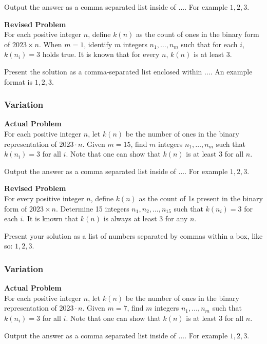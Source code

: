 Output the answer as a comma separated list inside of $\boxed{...}$. For example $\boxed{1, 2, 3}$.

\textbf{Revised Problem}\\
For each positive integer $n$, define $k(n)$ as the count of ones in the binary form of $2023 \times n$. 
When $m = 1$, identify $m$ integers $n_1, \dots, n_m$ such that for each $i$, $k(n_i) = 3$ holds true.
It is known that for every $n$, $k(n)$ is at least $3$.

Present the solution as a comma-separated list enclosed within $\boxed{...}$. An example format is $\boxed{1, 2, 3}$.

\subsubsection{Variation}
\textbf{Actual Problem}\\
For each positive integer $n$, let $k(n)$ be the number of ones in the binary representation of $2023 \cdot n$. 
Given $m = 15$, find $m$ integers $n_1, \dots, n_m$ such that $k(n_i) = 3$ for all $i$.
Note that one can show that $k(n)$ is at least $3$ for all $n$.

Output the answer as a comma separated list inside of $\boxed{...}$. For example $\boxed{1, 2, 3}$.

\textbf{Revised Problem}\\
For every positive integer \( n \), define \( k(n) \) as the count of 1s present in the binary form of \( 2023 \times n \). Determine 15 integers \( n_1, n_2, \ldots, n_{15} \) such that \( k(n_i) = 3 \) for each \( i \). It is known that \( k(n) \) is always at least 3 for any \( n \).

Present your solution as a list of numbers separated by commas within a box, like so: \(\boxed{1, 2, 3}\).

\subsubsection{Variation}
\textbf{Actual Problem}\\
For each positive integer $n$, let $k(n)$ be the number of ones in the binary representation of $2023 \cdot n$. 
Given $m = 7$, find $m$ integers $n_1, \dots, n_m$ such that $k(n_i) = 3$ for all $i$.
Note that one can show that $k(n)$ is at least $3$ for all $n$.

Output the answer as a comma separated list inside of $\boxed{...}$. For example $\boxed{1, 2, 3}$.


